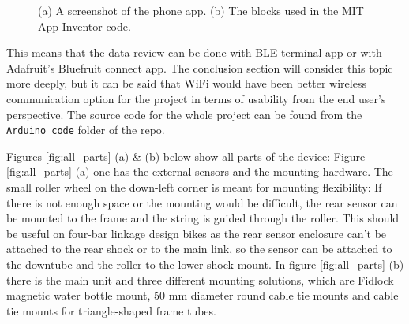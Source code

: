 \documentclass[a4paper,11pt]{article} %
\begin{document}
\begin{figure}[H]
    \hfill
    \hfill
    \hfill
    \caption{(a) A screenshot of the phone app. (b) The blocks used in the MIT App Inventor code.}
    \label{fig:MIT_app}
\end{figure}

This means that the data review can be done with BLE terminal app or with Adafruit's Bluefruit connect app. The conclusion section will consider this topic more deeply, but it can be said that WiFi would have been better wireless communication option for the project in terms of usability from the end user's perspective. The source code for the whole project can be found from the \texttt{Arduino code} folder of the repo.

Figures \ref{fig:all_parts} (a) \& (b) below show all parts of the device: Figure \ref{fig:all_parts} (a) one has the external sensors and the mounting hardware. The small roller wheel on the down-left corner is meant for mounting flexibility: If there is not enough space or the mounting would be difficult, the rear sensor can be mounted to the frame and the string is guided through the roller. This should be useful on four-bar linkage design bikes as the rear sensor enclosure can't be attached to the rear shock or to the main link, so the sensor can be attached to the downtube and the roller to the lower shock mount. In figure \ref{fig:all_parts} (b) there is the main unit and three different mounting solutions, which are Fidlock magnetic water bottle mount, 50 mm diameter round cable tie mounts and cable tie mounts for triangle-shaped frame tubes.
\end{document}
